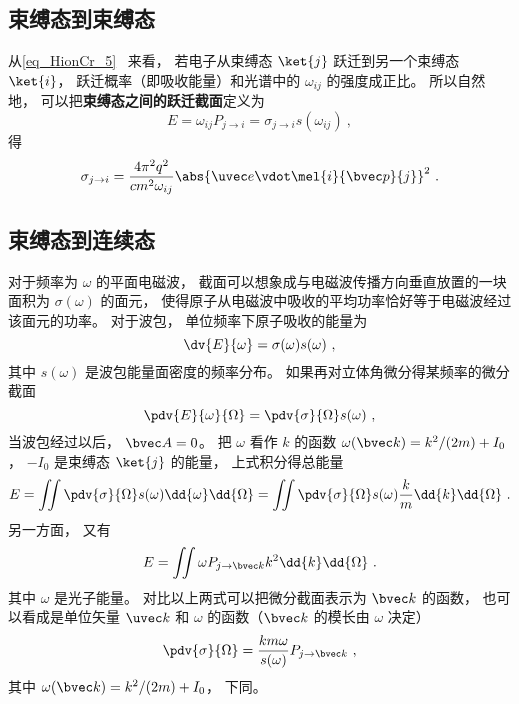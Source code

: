 
\begin{issues}
\issueDraft
\end{issues}


\subsection{束缚态到束缚态}
从\autoref{eq_HionCr_5}~ 来看， 若电子从束缚态 $\ket{j}$ 跃迁到另一个束缚态 $\ket{i}$， 跃迁概率（即吸收能量）和光谱中的 $\omega_{ij}$ 的强度成正比。 所以自然地， 可以把\textbf{束缚态之间的跃迁截面}定义为
\begin{equation}
E = \omega_{ij}P_{j\to i} = \sigma_{j\to i} s(\omega_{ij})~,
\end{equation}
得 %
\begin{equation}
\sigma_{j\to i} = \frac{4\pi^2 q^2}{c m^2 \omega_{ij}} \abs{\uvec e \vdot\mel{i}{\bvec p}{j}}^2~.
\end{equation}

\subsection{束缚态到连续态}
对于频率为 $\omega$ 的平面电磁波， 截面可以想象成与电磁波传播方向垂直放置的一块面积为 $\sigma(\omega)$ 的面元， 使得原子从电磁波中吸收的平均功率恰好等于电磁波经过该面元的功率。 对于波包， 单位频率下原子吸收的能量为
\begin{equation}
\dv{E}{\omega} = \sigma(\omega) s(\omega)~,
\end{equation}
其中 $s(\omega)$ 是波包能量面密度的频率分布。 如果再对立体角微分得某频率的微分截面 %
\begin{equation}
\pdv{E}{\omega}{\Omega} = \pdv{\sigma}{\Omega} s(\omega)~,
\end{equation}
当波包经过以后， $\bvec A = 0$。 把 $\omega$ 看作 $k$ 的函数 $\omega(\bvec k) = k^2/(2m) + I_0$， $-I_0$ 是束缚态 $\ket{j}$ 的能量， 上式积分得总能量
\begin{equation}
E = \iint \pdv{\sigma}{\Omega} s(\omega) \dd{\omega}\dd{\Omega} = \iint \pdv{\sigma}{\Omega} s(\omega) \frac{k}{m}\dd{k}\dd{\Omega}~.
\end{equation}
另一方面， 又有
\begin{equation}
E = \iint \omega P_{j\to {\bvec k}} k^2 \dd{k}\dd{\Omega}~.
\end{equation}
其中 $\omega$ 是光子能量。 对比以上两式可以把微分截面表示为 $\bvec k$ 的函数， 也可以看成是单位矢量 $\uvec k$ 和 $\omega$ 的函数（$\bvec k$ 的模长由 $\omega$ 决定）
\begin{equation}
\pdv{\sigma}{\Omega} = \frac{km \omega}{s(\omega)} P_{j\to \bvec k}~,
\end{equation}
其中 $\omega(\bvec k) = k^2/(2m) + I_0$， 下同。

